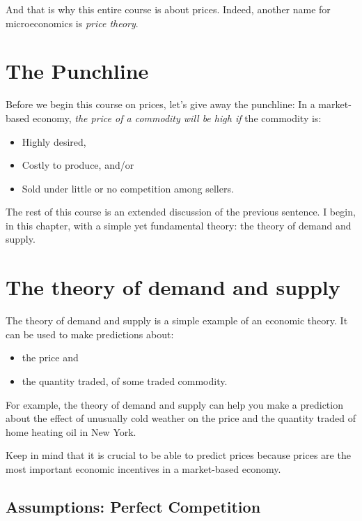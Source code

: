 \documentclass[
  letterpaper,
]{book}
\providecommand{\tightlist}{%
  \setlength{\itemsep}{0pt}\setlength{\parskip}{0pt}}\usepackage{longtable,booktabs,array}
\begin{document}
And that is why this entire course is about prices. Indeed, another name
for microeconomics is \emph{price theory}.

\section{The Punchline}\label{the-punchline}

Before we begin this course on prices, let's give away the punchline: In
a market-based economy, \emph{the price of a commodity will be high if}
the commodity is:

\begin{itemize}
\tightlist
\item
  Highly desired,
\item
  Costly to produce, and/or
\item
  Sold under little or no competition among sellers.
\end{itemize}

The rest of this course is an extended discussion of the previous
sentence. I begin, in this chapter, with a simple yet fundamental
theory: the theory of demand and supply.

\section{The theory of demand and
supply}\label{the-theory-of-demand-and-supply}

The theory of demand and supply is a simple example of an economic
theory. It can be used to make predictions about:

\begin{itemize}
\tightlist
\item
  the price and
\item
  the quantity traded, of some traded commodity.
\end{itemize}

For example, the theory of demand and supply can help you make a
prediction about the effect of unusually cold weather on the price and
the quantity traded of home heating oil in New York.

Keep in mind that it is crucial to be able to predict prices because
prices are the most important economic incentives in a market-based
economy.

\subsection{Assumptions: Perfect
Competition}\label{assumptions-perfect-competition}
\end{document}
